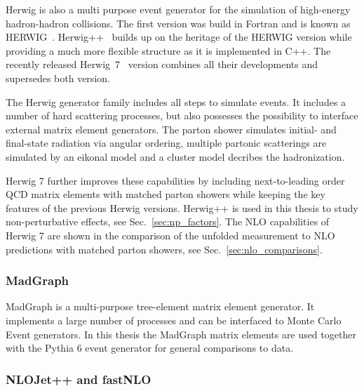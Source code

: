 Herwig is also a multi purpose event generator for the simulation of high-energy
hadron-hadron collisions. The first version was build in Fortran and is known as
HERWIG~\cite{Corcella:2000bw}. Herwig++~\cite{Bahr:2008pv} builds up on the
heritage of the HERWIG version while providing a much more flexible structure as
it is implemented in C++. The recently released Herwig~7~\cite{Bellm:2015jjp}
version combines all their developments and supersedes both version. 

The Herwig generator family includes all steps to simulate events. It includes a
number of hard scattering processes, but also possesses the possibility to
interface external matrix element generators. The parton shower simulates
initial- and final-state radiation via angular ordering, multiple partonic
scatterings are simulated by an eikonal model and a cluster model decribes the
hadronization. 

Herwig 7 further improves these capabilities by including next-to-leading order
QCD matrix elements with matched parton showers while keeping the key features
of the previous Herwig versions. Herwig++ is used in this thesis to study
non-perturbative effects, see Sec.~\ref{sec:np_factors}. The NLO capabilities of
Herwig 7 are shown in the comparison of the unfolded measurement to NLO
predictions with matched parton showers, see Sec.~\ref{sec:nlo_comparisons}.

\subsubsection{MadGraph}

MadGraph is a multi-purpose tree-element matrix element generator. It implements
a large number of processes and can be interfaced to Monte Carlo Event
generators. In this thesis the MadGraph matrix elements are used together with
the Pythia 6 event generator for general comparisons to data.

\subsubsection{NLOJet++ and fastNLO}
\label{sec:nlojetpp}



